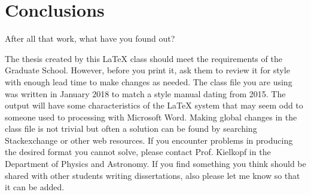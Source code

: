 \section{Conclusions}

After all that work, what have you found out?


The thesis created by this \LaTeX\/ class  should meet the requirements of the
Graduate School.  However, before you print it,  ask them to review it for style
with enough lead time to make changes as needed. The class file you are using
was written in January 2018 to match a style manual dating from 2015.  The
output will have some characteristics of the \LaTeX\/ system that may seem odd
to someone used to processing with Microsoft Word.  Making global changes in the
class file is not trivial but often a solution can be found by searching
Stackexchange or other web resources. If you encounter problems in producing the
desired format you cannot solve,  please contact Prof. Kielkopf in the
Department of Physics and Astronomy.  If you find something you think should be
shared with other students  writing dissertations, also please let me know so
that it can be added.








